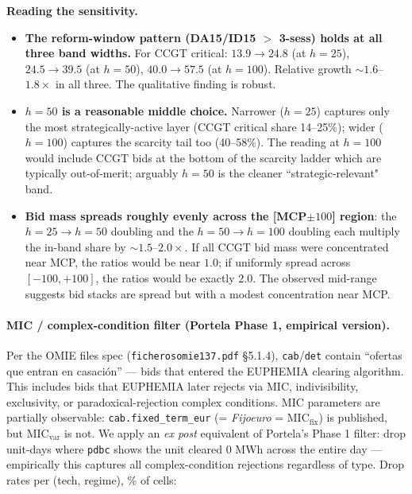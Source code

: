 \documentclass[11pt,a4paper]{article}
\newcommand{\code}[1]{\nolinkurl{#1}}
\begin{document}
\textbf{Reading the sensitivity.}
\begin{itemize}\setlength{\itemsep}{1pt}
\item \textbf{The reform-window pattern (DA15/ID15 $>$ 3-sess) holds at all three band widths.} For CCGT critical: $13.9 \to 24.8$ (at $h=25$), $24.5 \to 39.5$ (at $h=50$), $40.0 \to 57.5$ (at $h=100$). Relative growth $\sim 1.6$--$1.8\times$ in all three. The qualitative finding is robust.
\item \textbf{$h = 50$ is a reasonable middle choice.} Narrower ($h=25$) captures only the most strategically-active layer (CCGT critical share 14--25\%); wider ($h=100$) captures the scarcity tail too (40--58\%). The reading at $h=100$ would include CCGT bids at the bottom of the scarcity ladder which are typically out-of-merit; arguably $h=50$ is the cleaner ``strategic-relevant" band.
\item \textbf{Bid mass spreads roughly evenly across the [MCP$\pm 100$] region}: the $h=25 \to h=50$ doubling and the $h=50 \to h=100$ doubling each multiply the in-band share by $\sim 1.5$--$2.0\times$. If all CCGT bid mass were concentrated near MCP, the ratios would be near $1.0$; if uniformly spread across $[-100, +100]$, the ratios would be exactly $2.0$. The observed mid-range suggests bid stacks are spread but with a modest concentration near MCP.
\end{itemize}

\paragraph{MIC / complex-condition filter (Portela Phase 1, empirical version).} Per the OMIE files spec (\code{ficherosomie137.pdf} \S5.1.4), \code{cab}/\code{det} contain ``ofertas que entran en casación'' --- bids that entered the EUPHEMIA clearing algorithm. This includes bids that EUPHEMIA later rejects via MIC, indivisibility, exclusivity, or paradoxical-rejection complex conditions. MIC parameters are partially observable: \code{cab.fixed\_term\_eur} (= \emph{Fijoeuro} = $\text{MIC}_{\text{fix}}$) is published, but $\text{MIC}_{\text{var}}$ is not. We apply an \emph{ex post} equivalent of Portela's Phase 1 filter: drop unit-days where \code{pdbc} shows the unit cleared 0 MWh across the entire day --- empirically this captures all complex-condition rejections regardless of type. Drop rates per (tech, regime), \% of cells:

\begin{table}[H]
\centering\scriptsize
\caption{\textbf{MIC / complex-condition cell-level drop rates, bid-shape sample.} \% of unit-period cells in the bid-shape sample (\code{cab}/\code{det} ofertas que entran en casación) where the unit-day either does not appear in \code{pdbc} (sparse-zero) or appears with daily $\text{SUM}(\text{assigned\_power\_mw}) = 0$. CCGT is heavily affected (77--97\%); Hydro reservoir 22--29\%; Hydro pump 8--23\%; Nuclear/RES/Cogen $\le 7\%$. Source: \code{tab\_mic\_rates\_by\_tech\_regime.tex}.}
\label{tab:mic_drop_rates}
\setlength{\tabcolsep}{4pt}

\end{table}
\end{document}
